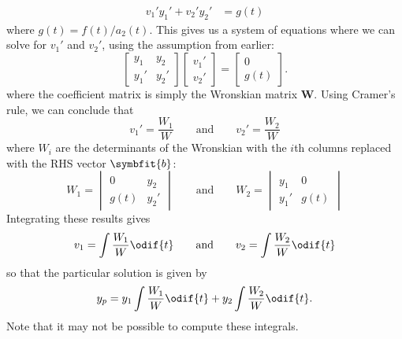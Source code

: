 \documentclass{article}
\begin{document}
\begin{appendix}
\begin{align*}
        v_1' y_1' + v_2' y_2'                                                                                                                            & = g\left( t \right)
    \end{align*}
    where \(g\left( t \right) = f\left( t \right) / a_2\left( t \right)\).
    This gives us a system of equations where we can solve for \(v_1'\) and \(v_2'\),
    using the assumption from earlier:
    \begin{equation*}
        \begin{bmatrix}
            y_1  & y_2  \\
            y_1' & y_2'
        \end{bmatrix}
        \begin{bmatrix}
            v_1' \\
            v_2'
        \end{bmatrix}
        =
        \begin{bmatrix}
            0 \\
            g\left( t \right)
        \end{bmatrix}.
    \end{equation*}
    where the coefficient matrix is simply the Wronskian matrix \(\symbf{W}\).
    Using Cramer's rule, we can conclude that
    \begin{equation*}
        v_1' = \frac{W_1}{W} \qquad \text{and} \qquad v_2' = \frac{W_2}{W}
    \end{equation*}
    where \(W_i\) are the determinants of the Wronskian with the \(i\)th columns replaced with the RHS vector \(\symbfit{b}\):
    \begin{equation*}
        W_1 = \begin{vmatrix}
            0                 & y_2  \\
            g\left( t \right) & y_2'
        \end{vmatrix}
        \qquad \text{and} \qquad
        W_2 = \begin{vmatrix}
            y_1  & 0                 \\
            y_1' & g\left( t \right)
        \end{vmatrix}
    \end{equation*}
    Integrating these results gives
    \begin{equation*}
        v_1 = \int \frac{W_1}{W} \odif{t} \qquad \text{and} \qquad v_2 = \int \frac{W_2}{W} \odif{t}
    \end{equation*}
    so that the particular solution is given by
    \begin{equation*}
        y_p = y_1 \int \frac{W_1}{W} \odif{t} + y_2 \int \frac{W_2}{W} \odif{t}.
    \end{equation*}
    Note that it may not be possible to compute these integrals.
\end{appendix}
\end{document}

